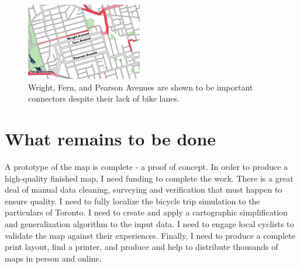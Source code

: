 \documentclass{article}
\begin{document}
		\begin{figure}[h!]
			\centering
			\includegraphics[width=0.45\textwidth]{spanned-gap}
			\caption{Wright, Fern, and Pearson Avenues are shown to be important connectors despite their lack of {\color{red}bike lanes}.}
			\label{fig:spanned-gap}
		\end{figure}
	
	\section*{What remains to be done}
		A prototype of the map is complete - a proof of concept. In order to produce a high-quality finished map, I need funding to complete the work.
		There is a great deal of manual data cleaning, surveying and verification that must happen to ensure quality. I need to fully localize the bicycle trip simulation to the particulars of Toronto. I need to create and apply a cartographic simplification and generalization algorithm to the input data. I need to engage local cyclists to validate the map against their experiences. Finally, I need to produce a complete print layout, find a printer, and produce and help to distribute thousands of maps in person and online. 
	
\end{document}
